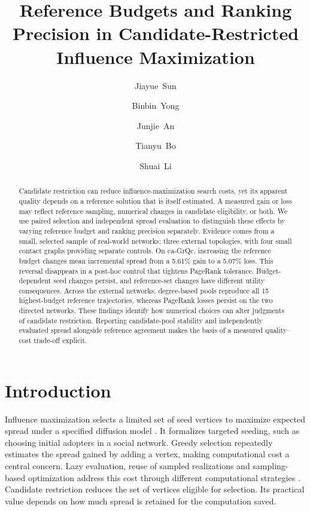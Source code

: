 \documentclass[smallextended]{svjour3}
\begin{document}
\title{Reference Budgets and Ranking Precision in Candidate-Restricted Influence Maximization}
\author{\mbox{Jiayue Sun} \and \mbox{Binbin Yong} \and \mbox{Junjie An} \and \mbox{Tianyu Bo} \and \mbox{Shuai Li}}
\date{}
\maketitle
\begin{abstract}
Candidate restriction can reduce influence-maximization search costs, yet its apparent quality depends on a reference solution that is itself estimated. A measured gain or loss may reflect reference sampling, numerical changes in candidate eligibility, or both. We use paired selection and independent spread evaluation to distinguish these effects by varying reference budget and ranking precision separately. Evidence comes from a small, selected sample of real-world networks: three external topologies, with four small contact graphs providing separate controls. On ca-GrQc, increasing the reference budget changes mean incremental spread from a 5.61\% gain to a 5.07\% loss. This reversal disappears in a post-hoc control that tightens PageRank tolerance. Budget-dependent seed changes persist, and reference-set changes have different utility consequences. Across the external networks, degree-based pools reproduce all 15 highest-budget reference trajectories, whereas PageRank losses persist on the two directed networks. These findings identify how numerical choices can alter judgments of candidate restriction. Reporting candidate-pool stability and independently evaluated spread alongside reference agreement makes the basis of a measured quality--cost trade-off explicit.
\end{abstract}

\section{Introduction}
Influence maximization selects a limited set of seed vertices to maximize expected spread under a specified diffusion model \cite{ref1}. It formalizes targeted seeding, such as choosing initial adopters in a social network. Greedy selection repeatedly estimates the spread gained by adding a vertex, making computational cost a central concern. Lazy evaluation, reuse of sampled realizations and sampling-based optimization address this cost through different computational strategies \cite{ref7,ref8,ref2}. Candidate restriction reduces the set of vertices eligible for selection. Its practical value depends on how much spread is retained for the computation saved.
\end{document}

